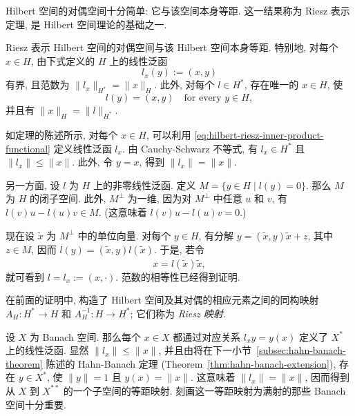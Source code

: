 Hilbert 空间的对偶空间十分简单: 它与该空间本身等距. 这一结果称为 Riesz 表示定理, 是 Hilbert 空间理论的基础之一.

\begin{Theorem}{Riesz 表示}
\label{thm:hilbert-riesz-representation}
Hilbert 空间的对偶空间与该 Hilbert 空间本身等距. 特别地, 对每个 $x\in H$, 由下式定义的 $H$ 上的线性泛函
\begin{equation}\label{eq:hilbert-riesz-inner-product-functional}
l_x(y):=(x,y)
\end{equation}
有界, 且范数为 $\|l_x\|_{H^*}=\|x\|_H$. 此外, 对每个 $l\in H^*$, 存在唯一的 $x\in H$, 使
\begin{equation}\label{eq:hilbert-riesz-functional-representation}
l(y)=(x,y)\quad\text{for every }y\in H,
\end{equation}
并且有 $\|x\|_H=\|l\|_{H^*}$.
\end{Theorem}

\begin{Proof}
如定理的陈述所示, 对每个 $x\in H$, 可以利用 \eqref{eq:hilbert-riesz-inner-product-functional} 定义线性泛函 $l_x$. 由 Cauchy-Schwarz 不等式, 有 $l_x\in H^*$ 且 $\|l_x\|\leq\|x\|$. 此外, 令 $y=x$, 得到 $\|l_x\|=\|x\|$.

另一方面, 设 $l$ 为 $H$ 上的非零线性泛函. 定义 $M=\{y\in H\mid l(y)=0\}$. 那么 $M$ 为 $H$ 的闭子空间. 此外, $M^\perp$ 为一维, 因为对 $M^\perp$ 中任意 $u$ 和 $v$, 有 $l(v)u-l(u)v\in M$. (这意味着 $l(v)u-l(u)v=0$.)

现在设 $\widetilde x$ 为 $M^\perp$ 中的单位向量. 对每个 $y\in H$, 有分解 $y=(\widetilde x,y)\widetilde x+z$, 其中 $z\in M$, 因而 $l(y)=(\widetilde x,y)l(\widetilde x)$. 于是, 若令
\begin{equation}\label{eq:riesz-representing-vector-from-kernel-complement}
x=\overline{l(\widetilde x)}\widetilde x,
\end{equation}
就可看到 $l=l_x:=(x,\cdot)$. 范数的相等性已经得到证明.
\end{Proof}

\begin{Remark}
\label{rem:riesz-mappings}
在前面的证明中, 构造了 Hilbert 空间及其对偶的相应元素之间的同构映射 $A_H:H^*\to H$ 和 $A_H^{-1}:H\to H^*$; 它们称为 \emph{Riesz 映射}.
\end{Remark}

\begin{Example}
\label{ex:canonical-bidual-isometry}
设 $X$ 为 Banach 空间. 那么每个 $x\in X$ 都通过对应关系 $l_xy=y(x)$ 定义了 $X^*$ 上的线性泛函. 显然 $\|l_x\|\leq\|x\|$, 并且由将在下一小节~\ref{subsec:hahn-banach-theorem} 陈述的 Hahn-Banach 定理 (Theorem~\ref{thm:hahn-banach-extension}), 存在 $y\in X^*$, 使 $\|y\|=1$ 且 $y(x)=\|x\|$. 这意味着 $\|l_x\|=\|x\|$, 因而得到从 $X$ 到 $X^{**}$ 的一个子空间的等距映射. 刻画这一等距映射为满射的那些 Banach 空间十分重要.
\end{Example}

